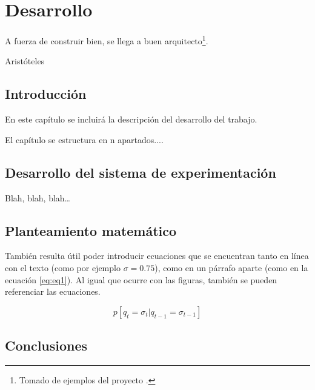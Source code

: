 \chapter{Desarrollo}
\label{cha:desarrollo}


\begin{FraseCelebre}
  \begin{Frase}
    A fuerza de construir bien, se llega a buen arquitecto\footnote{Tomado de ejemplos del proyecto \texis{}.}.
  \end{Frase}
  \begin{Fuente}
    Aristóteles
  \end{Fuente}
\end{FraseCelebre}


\section{Introducción}
\label{sec:introduccion-desarrollo}

En este capítulo se incluirá la descripción del desarrollo del trabajo.

El capítulo se estructura en n apartados....


\section{Desarrollo del sistema de experimentación}
\label{sec:desarr-del-sist}

Blah, blah, blah\ldots


\section{Planteamiento matemático}
\label{sec:libr-desarr}

También resulta útil poder introducir ecuaciones que se encuentran tanto en línea con el texto (como por ejemplo $\sigma=0.75$), como en un párrafo aparte (como en la ecuación \ref{eq:eq1}). Al igual que ocurre con las figuras, también se pueden referenciar las ecuaciones.

\begin{equation}
  \label{eq:eq1}
  p[q_t=\sigma_t|q_{t-1}=\sigma_{t-1}]
\end{equation}

\section{Conclusiones}
\label{sec:conclusiones-desarrollo}

